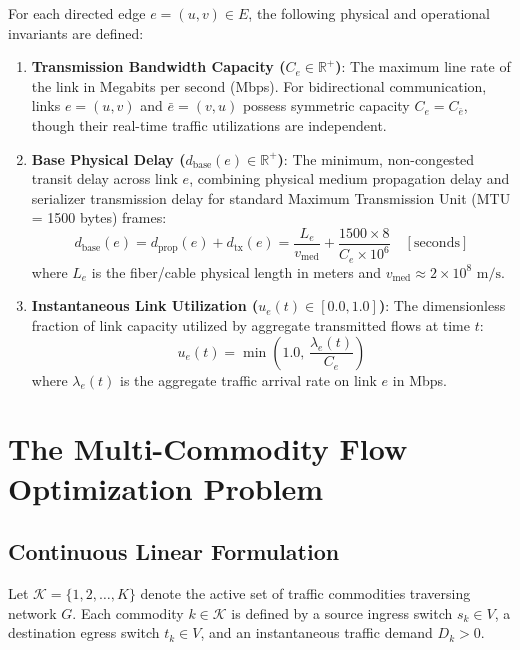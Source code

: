 \documentclass[12pt,a4paper,oneside]{report}
\begin{document}
For each directed edge $e = (u, v) \in E$, the following physical and operational invariants are defined:
\begin{enumerate}
    \item \textbf{Transmission Bandwidth Capacity ($C_e \in \mathbb{R}^+$)}: The maximum line rate of the link in Megabits per second (Mbps). For bidirectional communication, links $e = (u, v)$ and $\bar{e} = (v, u)$ possess symmetric capacity $C_e = C_{\bar{e}}$, though their real-time traffic utilizations are independent.
    \item \textbf{Base Physical Delay ($d_{\text{base}}(e) \in \mathbb{R}^+$)}: The minimum, non-congested transit delay across link $e$, combining physical medium propagation delay and serializer transmission delay for standard Maximum Transmission Unit (MTU = 1500 bytes) frames:
    \begin{equation}
        d_{\text{base}}(e) = d_{\text{prop}}(e) + d_{\text{tx}}(e) = \frac{L_e}{v_{\text{med}}} + \frac{1500 \times 8}{C_e \times 10^6} \quad [\text{seconds}]
    \end{equation}
    where $L_e$ is the fiber/cable physical length in meters and $v_{\text{med}} \approx 2 \times 10^8\text{ m/s}$.
    \item \textbf{Instantaneous Link Utilization ($u_e(t) \in [0.0, 1.0]$)}: The dimensionless fraction of link capacity utilized by aggregate transmitted flows at time $t$:
    \begin{equation}
        u_e(t) = \min\left(1.0, \, \frac{\lambda_e(t)}{C_e}\right)
    \end{equation}
    where $\lambda_e(t)$ is the aggregate traffic arrival rate on link $e$ in Mbps.
\end{enumerate}

\section{The Multi-Commodity Flow Optimization Problem}

\subsection{Continuous Linear Formulation}
Let $\mathcal{K} = \{1, 2, \dots, K\}$ denote the active set of traffic commodities traversing network $G$. Each commodity $k \in \mathcal{K}$ is defined by a source ingress switch $s_k \in V$, a destination egress switch $t_k \in V$, and an instantaneous traffic demand $D_k > 0$.
\end{document}

